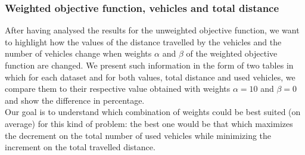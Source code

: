 \subsubsection{Weighted objective function, vehicles and total distance}
After having analysed the results for the unweighted objective function, we want to highlight how the values of the distance travelled by the vehicles and the number of vehicles change when weights $\alpha$ and $\beta$ of the weighted objective function are changed.
We present such information in the form of two tables in which for each dataset and for both values, total distance and used vehicles, we compare them to their respective value obtained with weights $\alpha=10$ and $\beta=0$ and show the difference in percentage.\\
Our goal is to understand which combination of weights could be best suited (on average) for this kind of problem: the best one would be that which maximizes the decrement on the total number of used vehicles while minimizing the increment on the total travelled distance.
